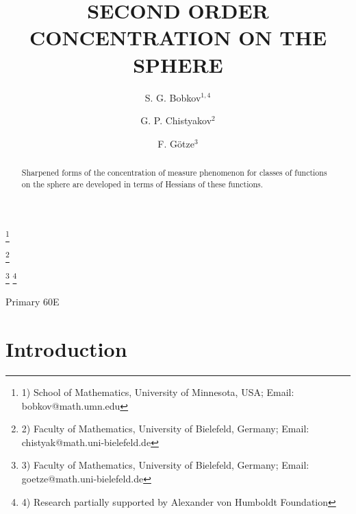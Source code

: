 \documentclass[reqno,12pt]{amsart}
\theoremstyle{plain}
\begin{document}
\title[Second Order Concentration]{SECOND ORDER CONCENTRATION ON THE SPHERE \\
}

\author{S. G. Bobkov$^{1,4}$}
\thanks{1) School of Mathematics, University of Minnesota, USA;
Email: bobkov@math.umn.edu}
\address
{Sergey G. Bobkov \newline
School of Mathematics, University of Minnesota   Vincent Hall, 206 Church St. S.E., Minneapolis, MN 55455 USA
\smallskip}

\author{G. P. Chistyakov$^{2}$}
\thanks{2) Faculty of Mathematics, University of Bielefeld, Germany;
Email: chistyak@math.uni-bielefeld.de}
\address
{Gennadiy P. Chistyakov\newline
Fakult\"at f\"ur Mathematik, Universit\"at Bielefeld\newline
Postfach 100131, 33501 Bielefeld, Germany}

\author{F. G\"otze$^{3}$}
\thanks{3) Faculty of Mathematics, University of Bielefeld, Germany;
Email: goetze@math.uni-bielefeld.de}
\thanks{4) Research partially supported by 
Alexander von Humboldt Foundation}
\address
{Friedrich G\"otze\newline
Fakult\"at f\"ur Mathematik, Universit\"at Bielefeld\newline
Postfach 100131, 33501 Bielefeld, Germany}

\subjclass
{Primary 60E} 

\begin{abstract}
Sharpened forms of the concentration of measure phenomenon for classes of
functions on the sphere are developed in terms of Hessians of these 
functions.
\end{abstract}

\maketitle
{}

\section{{\bf Introduction}}
\setcounter{equation}{0}
\end{document}
